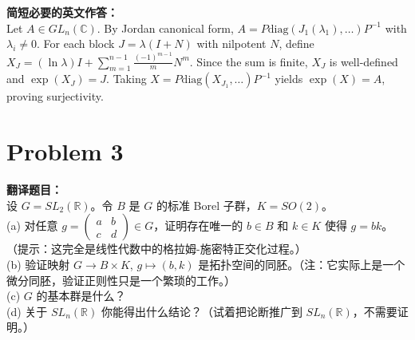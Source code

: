 \documentclass{ctexart}
\begin{document}
\vspace{1em}
\textbf{简短必要的英文作答：}\\
Let $A \in GL_n(\mathbb{C})$. By Jordan canonical form, $A = P \text{diag}(J_1(\lambda_1), \dots) P^{-1}$ with $\lambda_i \neq 0$. For each block $J = \lambda(I+N)$ with nilpotent $N$, define $X_J = (\ln\lambda)I + \sum_{m=1}^{n-1} \frac{(-1)^{m-1}}{m} N^m$. Since the sum is finite, $X_J$ is well-defined and $\exp(X_J) = J$. Taking $X = P \text{diag}(X_{J_1}, \dots) P^{-1}$ yields $\exp(X) = A$, proving surjectivity.

\vspace{2em}
\section*{Problem 3}
\textbf{翻译题目：}\\
设 $G = SL_2(\mathbb{R})$。令 $B$ 是 $G$ 的标准 Borel 子群，$K = SO(2)$。\\
(a) 对任意 $g = \begin{pmatrix} a & b \\ c & d \end{pmatrix} \in G$，证明存在唯一的 $b \in B$ 和 $k \in K$ 使得 $g = bk$。（提示：这完全是线性代数中的格拉姆-施密特正交化过程。）\\
(b) 验证映射 $G \to B \times K$, $g \mapsto (b, k)$ 是拓扑空间的同胚。（注：它实际上是一个微分同胚，验证正则性只是一个繁琐的工作。）\\
(c) $G$ 的基本群是什么？\\
(d) 关于 $SL_n(\mathbb{R})$ 你能得出什么结论？（试着把论断推广到 $SL_n(\mathbb{R})$，不需要证明。）
\end{document}
